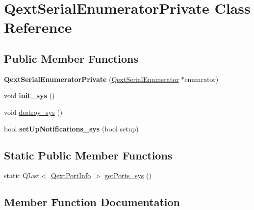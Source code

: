 \hypertarget{classQextSerialEnumeratorPrivate}{}\section{Qext\+Serial\+Enumerator\+Private Class Reference}
\label{classQextSerialEnumeratorPrivate}
\subsection*{Public Member Functions}
\begin{DoxyCompactItemize}
\item 
\mbox{\label{classQextSerialEnumeratorPrivate_a68080efc6f1bf4ba3d61354caa6b1f77}} 
{\bfseries Qext\+Serial\+Enumerator\+Private} (\hyperlink{classQextSerialEnumerator}{Qext\+Serial\+Enumerator} $\ast$enumrator)
\item 
\mbox{\label{classQextSerialEnumeratorPrivate_ad330f9110a9ad5ccdc573a014abf86d3}} 
void {\bfseries init\+\_\+sys} ()
\item 
void \hyperlink{classQextSerialEnumeratorPrivate_a5df524fc6cab36d07e9c94a8e128ae1b}{destroy\+\_\+sys} ()
\item 
\mbox{\label{classQextSerialEnumeratorPrivate_adea498a9679b55e80f03f92d469b3ffb}} 
bool {\bfseries set\+Up\+Notifications\+\_\+sys} (bool setup)
\end{DoxyCompactItemize}
\subsection*{Static Public Member Functions}
\begin{DoxyCompactItemize}
\item 
static Q\+List$<$ \hyperlink{structQextPortInfo}{Qext\+Port\+Info} $>$ \hyperlink{classQextSerialEnumeratorPrivate_a5293c28583f85d2efeef7e4f3bc4aeba}{get\+Ports\+\_\+sys} ()
\end{DoxyCompactItemize}


\subsection{Member Function Documentation}
\mbox{\label{classQextSerialEnumeratorPrivate_a5df524fc6cab36d07e9c94a8e128ae1b}} 
